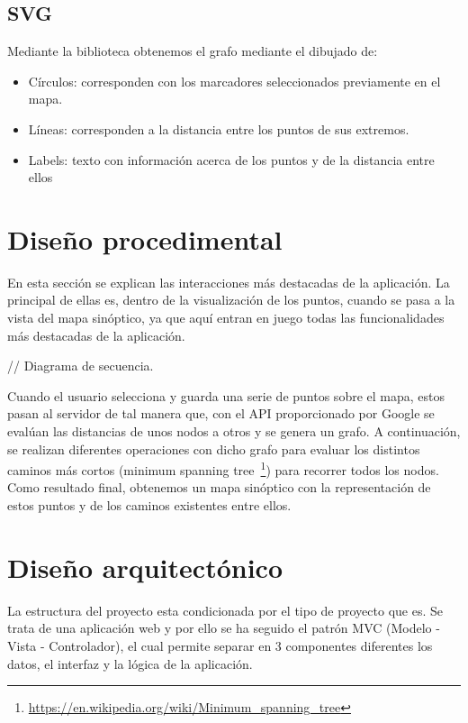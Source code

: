 \subsection{SVG}
Mediante la biblioteca  obtenemos el grafo mediante el dibujado de:
\begin{itemize}
	\item Círculos: corresponden con los marcadores seleccionados previamente en el mapa.
	\item Líneas: corresponden a la distancia entre los puntos de sus extremos.
	\item Labels: texto con información acerca de los puntos y de la distancia entre ellos
\end{itemize}


\section{Diseño procedimental}
En esta sección se explican las interacciones más destacadas de la aplicación. La principal de ellas es, dentro de la visualización de los puntos, cuando se pasa a la vista del mapa sinóptico, ya que aquí entran en juego todas las funcionalidades más destacadas de la aplicación.


// Diagrama de secuencia.


Cuando el usuario selecciona y guarda una serie de puntos sobre el mapa, estos pasan al servidor de tal manera que, con el API proporcionado por Google se evalúan las distancias de unos nodos a otros y se genera un grafo. A continuación, se realizan diferentes operaciones con dicho grafo para evaluar los distintos caminos más cortos (minimum spanning tree~\footnote{\url{https://en.wikipedia.org/wiki/Minimum_spanning_tree}}) para recorrer todos los nodos. \\
Como resultado final, obtenemos un mapa sinóptico con la representación de estos puntos y de los caminos existentes entre ellos.


\section{Diseño arquitectónico}

La estructura del proyecto esta condicionada por el tipo de proyecto que es. Se trata de una aplicación web y por ello se ha seguido el patrón MVC (Modelo - Vista - Controlador), el cual permite separar en 3 componentes diferentes los datos, el interfaz y la lógica de la aplicación. 

